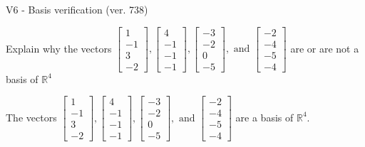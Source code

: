 \begin{exercise}
  \begin{exerciseTitle}V6 - Basis verification (ver. 738)\end{exerciseTitle}
  \begin{exerciseStatement}
    Explain why the vectors \(\left[\begin{array}{r}
1 \\
-1 \\
3 \\
-2
\end{array}\right] , \left[\begin{array}{r}
4 \\
-1 \\
-1 \\
-1
\end{array}\right] , \left[\begin{array}{r}
-3 \\
-2 \\
0 \\
-5
\end{array}\right] , \text{ and } \left[\begin{array}{r}
-2 \\
-4 \\
-5 \\
-4
\end{array}\right]\) are or are not a basis of \(\mathbb{R}^4\)	


  \end{exerciseStatement}
  \begin{exerciseAnswer}
   The vectors \(\left[\begin{array}{r}
1 \\
-1 \\
3 \\
-2
\end{array}\right] , \left[\begin{array}{r}
4 \\
-1 \\
-1 \\
-1
\end{array}\right] , \left[\begin{array}{r}
-3 \\
-2 \\
0 \\
-5
\end{array}\right] , \text{ and } \left[\begin{array}{r}
-2 \\
-4 \\
-5 \\
-4
\end{array}\right]\) 
  	 are  a basis of \(\mathbb{R}^4\).
  


  \end{exerciseAnswer}
\end{exercise}